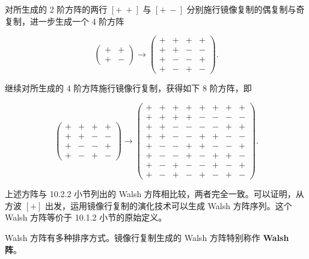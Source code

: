 \documentclass[
  10pt,
  fontset=fandol]{ctexart}
\begin{document}
对所生成的 2 阶方阵的两行 \([+\ +]\) 与 \([+\ -]\) 分别施行镜像复制的偶复制与奇复制，进一步生成一个 4 阶方阵

\[
\begin{pmatrix}+&+\\+&-\end{pmatrix}\longrightarrow
\begin{pmatrix}
+&+&+&+\\
+&+&-&-\\
+&-&-&+\\
+&-&+&-
\end{pmatrix}.
\]

继续对所生成的 4 阶方阵施行镜像行复制，获得如下 8 阶方阵，即

\[
\begin{pmatrix}
+&+&+&+\\
+&+&-&-\\
+&-&-&+\\
+&-&+&-
\end{pmatrix}\longrightarrow
\begin{pmatrix}
+&+&+&+&+&+&+&+\\
+&+&+&+&-&-&-&-\\
+&+&-&-&-&-&+&+\\
+&+&-&-&+&+&-&-\\
+&-&-&+&+&-&-&+\\
+&-&-&+&-&+&+&-\\
+&-&+&-&-&+&-&+\\
+&-&+&-&+&-&+&-
\end{pmatrix}.
\]

上述方阵与 10.2.2 小节列出的 Walsh 方阵相比较，两者完全一致。可以证明，从方波 \([+]\) 出发，运用镜像行复制的演化技术可以生成 Walsh 方阵序列。这个 Walsh 方阵等价于 10.1.2 小节的原始定义。

Walsh 方阵有多种排序方式。镜像行复制生成的 Walsh 方阵特别称作 \textbf{Walsh 阵}。
\end{document}
